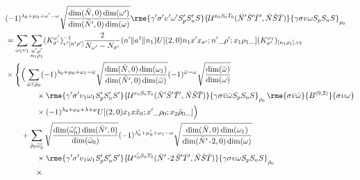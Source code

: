 \documentclass[%
  aps,%
  prc,%
  showpacs,%
  superscriptaddress,%
  onecolumn,%
  notitlepage,%
  11pt,%
  floatfix,%
  amsmath,%
  amssymb,%
]{revtex4-2}
\newcommand{\negative}{\,\text{-}}
\begin{document}
\begin{align*}
  &(-1)^{\lambda_0+\mu_0+\omega'-\omega} \sqrt{\frac{\dim(\bar{N},0)\dim(\omega')}{\dim(\bar{N}',0)\dim(\omega)}}
  \rme{\gamma'\sigma'\upsilon'\omega'S_p'S_n'S}{\mathcal{U}^{x_0 S_0 T_0}(\bar{N}'\bar{S}'\bar{T}',\bar{N}\bar{S}\bar{T})}{\gamma\sigma\upsilon\omega S_p S_n S}_{\rho_0}\\
  &=\sum_{\omega_1\upsilon_1} \sum_{\substack{n'\rho'\\n_1\rho_1}}(K_{\sigma'}^{\omega'})_{\upsilon'[n'\rho']}^{-1}\frac{2}{N_{\omega'} - N_{\sigma'}}(n'\Vert{}a^\dagger\Vert{}n_1) U[(2,0)n_1 x' x_{\sigma'};n'\_\rho';x_1\rho_1\_](K_{\sigma'}^{\omega_1})_{[n_1\rho_1],\upsilon_1}\\
  &\times\Bigg\{\Big(\sum_{\bar{\omega}\bar{\upsilon}\bar{\rho}_0}
      (-1)^{\lambda_0+\mu_0+\omega_1-\bar{\omega}}
      \sqrt{\frac{\dim(\bar{N},0)\dim(\omega_1)}{\dim(\bar{N}',0)\dim(\bar{\omega})}}
      (-1)^{\bar{\omega}-\omega}
      \sqrt{\frac{\dim(\bar{\omega})}{\dim(\omega)}}
      \\
      & \qquad \qquad \times
      \rme{\gamma'\sigma'\upsilon_1\omega_1 S_p' S_n' S'}{\mathcal{U}^{x_0S_0T_0}(\bar{N}'\bar{S}'\bar{T}',\bar{N}\bar{S}\bar{T})}{\gamma \sigma \bar{\upsilon}\bar{\omega} S_p S_n S}_{\bar{\rho}_0} \, \rme{\sigma \bar{\upsilon}\bar{\omega}}{B^{(0,2)}}{\sigma \upsilon \omega}\\
  &\qquad\qquad\times
      (-1)^{\lambda_2+\mu_2+\lambda+\mu} U[(2,0) x_1 x \tilde{x}_0; x' \_ \rho_0; x_2\bar{\rho}_0\_]
    \Big)\\
  &\qquad+\sum_{\bar{\rho}_0\tilde{\omega}_0'}
  \sqrt{\frac{\dim(\tilde{\omega}_0')\dim(\bar{N}',0)}{\dim(\tilde{\omega}_0)}}
  (-1)^{\lambda_0'+\mu_0'+\omega_1-\omega} \sqrt{\frac{\dim(\bar{N},0)\dim(\omega_1)}{\dim(\bar{N}'\negative2,0)\dim(\omega)}} \\
  & \qquad \qquad \times
  \rme{\gamma'\sigma'\upsilon_1\omega_1 S_p' S_n' S'}{\mathcal{U}^{x_0'S_0T_0}(\bar{N}'\negative2\,\bar{S}'\bar{T}',\bar{N}\bar{S}\bar{T})}{\gamma \sigma \upsilon \omega S_p S_n S}_{\bar{\rho}_0}\\
  &\qquad\qquad\times

\end{align*}
\end{document}
